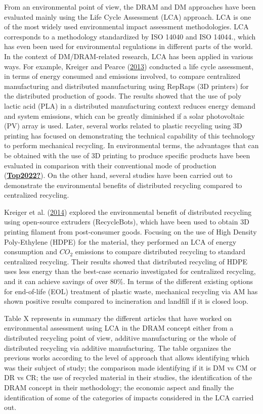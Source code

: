 \documentclass[12pt]{elsarticle} %
\begin{document}
From an environmental point of view, the DRAM and DM approaches have been evaluated mainly using the Life Cycle Assessment (LCA) approach.
LCA is one of the most widely used environmental impact assessment methodologies. LCA corresponds to a methodology standardized by ISO 14040 and ISO 14044., which has even been used for environmental regulations in different parts of the world.
In the context of DM/DRAM-related research, LCA has been applied in various ways.
For example, Kreiger and Pearce (\protect\hyperlink{ref-Kreiger2013}{2013}) conducted a life cycle assessment, in terms of energy consumed and emissions involved, to compare centralized manufacturing and distributed manufacturing using RepRaps (3D printers) for the distributed production of goods.
The results showed that the use of poly lactic acid (PLA) in a distributed manufacturing context reduces energy demand and system emissions, which can be greatly diminished if a solar photovoltaic (PV) array is used.
Later, several works related to plastic recycling using 3D printing has focused on demonstrating the technical capability of this technology to perform mechanical recycling. In environmental terms, the advantages that can be obtained with the use of 3D printing to produce specific products have been evaluated in comparison with their conventional mode of production (\protect\hyperlink{ref-Top2022}{\textbf{Top2022?}}).
On the other hand, several studies have been carried out to demonstrate the environmental benefits of distributed recycling compared to centralized recycling.

Kreiger et al. (\protect\hyperlink{ref-Kreiger2014}{2014}) explored the environmental benefit of distributed recycling using open-source extruders (RecycleBots), which have been used to obtain 3D printing filament from post-consumer goods.
Focusing on the use of High Density Poly-Ethylene (HDPE) for the material, they performed an LCA of energy consumption and \(CO_{2}\) emissions to compare distributed recycling to standard centralized recycling.
Their results showed that distributed recycling of HDPE uses less energy than the best-case scenario investigated for centralized recycling, and it can achieve savings of over 80\%.
In terms of the different existing options for end-of-life (EOL) treatment of plastic waste, mechanical recycling via AM has shown positive results compared to incineration and landfill if it is closed loop.

Table X represents in summary the different articles that have worked on environmental assessment using LCA in the DRAM concept either from a distributed recycling point of view, additive manufacturing or the whole of distributed recycling via additive manufacturing. The table organizes the previous works according to the level of approach that allows identifying which was their subject of study; the comparison made identifying if it is DM vs CM or DR vs CR; the use of recycled material in their studies, the identification of the DRAM concept in their methodology; the economic aspect and finally the identification of some of the categories of impacts considered in the LCA carried out.
\end{document}

